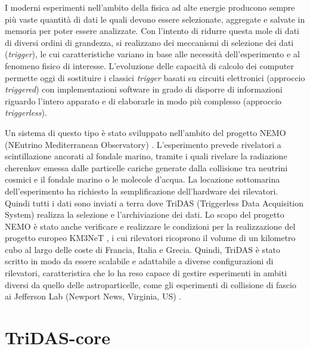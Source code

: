 \documentclass[../main.tex]{subfiles}
\begin{document}

I moderni esperimenti nell'ambito della fisica ad alte energie producono sempre più vaste quantità di dati le quali devono essere selezionate, aggregate e salvate in memoria per poter essere analizzate.  
Con l'intento di ridurre questa mole di dati di diversi ordini di grandezza, si realizzano dei meccanismi di selezione dei dati (\emph{trigger}), le cui caratteristiche variano in base alle necessità dell'esperimento e al fenomeno fisico di interesse.
L'evoluzione delle capacità di calcolo dei computer permette oggi di sostituire i classici \emph{trigger} basati su circuiti elettronici (approccio \emph{triggered}) con implementazioni software in grado di disporre di informazioni riguardo l'intero apparato e di elaborarle in modo più complesso (approccio \emph{triggerless}).  

Un sistema di questo tipo è stato sviluppato nell'ambito del progetto \mbox{NEMO} (NEutrino Mediterranean Observatory) \cite{CHIARUSI2013129}. L'esperimento prevede rivelatori a scintillazione ancorati al fondale marino, tramite i quali rivelare la radiazione cherenkov emessa dalle particelle cariche generate dalla collisione tra neutrini cosmici e il fondale marino o le molecole d'acqua. La locazione sottomarina dell'esperimento ha richiesto la semplificazione dell'hardware dei rilevatori. Quindi tutti i dati sono inviati a terra dove TriDAS (Triggerless Data Acquisition System) realizza la selezione e l'archiviazione dei dati.
Lo scopo del progetto NEMO è stato anche verificare e realizzare le condizioni per la realizzazione del progetto europeo KM3NeT \cite{km3}, i cui rilevatori ricoprono il volume di un kilometro cubo al largo delle coste di Francia, Italia e Grecia. 
Quindi, TriDAS è stato scritto in modo da essere scalabile e adattabile a diverse configurazioni di rilevatori, caratteristica che lo ha reso capace di gestire esperimenti in ambiti diversi da quello delle astroparticelle, come gli esperimenti di collisione di fascio ai Jefferson Lab (Newport News, Virginia, US) \cite{3x3telescope}. 

\section{TriDAS-core}
\end{document}
